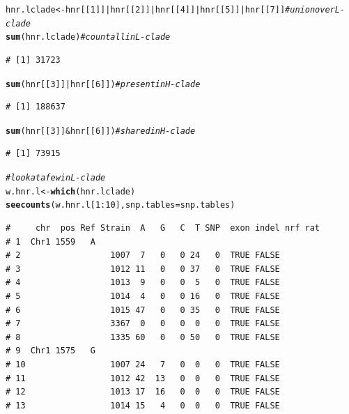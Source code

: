 \documentclass{article}\usepackage[]{graphicx}\usepackage[]{color}
\makeatletter
\newcommand{\hlnum}[1]{\textcolor[rgb]{0.686,0.059,0.569}{#1}}%
\newcommand{\hlcom}[1]{\textcolor[rgb]{0.678,0.584,0.686}{\textit{#1}}}%
\newcommand{\hlopt}[1]{\textcolor[rgb]{0,0,0}{#1}}%
\newcommand{\hlstd}[1]{\textcolor[rgb]{0.345,0.345,0.345}{#1}}%
\newcommand{\hlkwb}[1]{\textcolor[rgb]{0.69,0.353,0.396}{#1}}%
\newcommand{\hlkwc}[1]{\textcolor[rgb]{0.333,0.667,0.333}{#1}}%
\newcommand{\hlkwd}[1]{\textcolor[rgb]{0.737,0.353,0.396}{\textbf{#1}}}%
\newenvironment{kframe}{%
 \def\at@end@of@kframe{}%
 \ifinner\ifhmode%
  \def\at@end@of@kframe{\end{minipage}}%
  \begin{minipage}{\columnwidth}%
 \fi\fi%
 \def\FrameCommand##1{\hskip\@totalleftmargin \hskip-\fboxsep
 \colorbox{shadecolor}{##1}\hskip-\fboxsep
     \hskip-\linewidth \hskip-\@totalleftmargin \hskip\columnwidth}%
 \MakeFramed {\advance\hsize-\width
   \@totalleftmargin\z@ \linewidth\hsize
   \@setminipage}}%
 {\par\unskip\endMakeFramed%
 \at@end@of@kframe}
\newenvironment{knitrout}{}{} %
\makeatother
\begin{document}
\begin{knitrout}
\begin{kframe}
\begin{alltt}
\hlstd{hnr.lclade} \hlkwb{<-} \hlstd{hnr[[}\hlnum{1}\hlstd{]]} \hlopt{|} \hlstd{hnr[[}\hlnum{2}\hlstd{]]} \hlopt{|} \hlstd{hnr[[}\hlnum{4}\hlstd{]]} \hlopt{|} \hlstd{hnr[[}\hlnum{5}\hlstd{]]} \hlopt{|} \hlstd{hnr[[}\hlnum{7}\hlstd{]]}  \hlcom{# union over L-clade}
\hlkwd{sum}\hlstd{(hnr.lclade)}                                                     \hlcom{# count all in L-clade}
\end{alltt}
\begin{verbatim}
# [1] 31723
\end{verbatim}
\begin{alltt}
\hlkwd{sum}\hlstd{(hnr[[}\hlnum{3}\hlstd{]]} \hlopt{|} \hlstd{hnr[[}\hlnum{6}\hlstd{]])}                                            \hlcom{# present in H-clade}
\end{alltt}
\begin{verbatim}
# [1] 188637
\end{verbatim}
\begin{alltt}
\hlkwd{sum}\hlstd{(hnr[[}\hlnum{3}\hlstd{]]} \hlopt{&} \hlstd{hnr[[}\hlnum{6}\hlstd{]])}                                            \hlcom{# shared in H-clade}
\end{alltt}
\begin{verbatim}
# [1] 73915
\end{verbatim}
\begin{alltt}
\hlcom{# look at a few in L-clade}
\hlstd{w.hnr.l} \hlkwb{<-} \hlkwd{which}\hlstd{(hnr.lclade)}
\hlkwd{seecounts}\hlstd{(w.hnr.l[}\hlnum{1}\hlopt{:}\hlnum{10}\hlstd{],}\hlkwc{snp.tables}\hlstd{=snp.tables)}
\end{alltt}
\begin{verbatim}
#     chr  pos Ref Strain  A   G   C  T SNP  exon indel nrf rat
# 1  Chr1 1559   A                                             
# 2                  1007  7   0   0 24   0  TRUE FALSE        
# 3                  1012 11   0   0 37   0  TRUE FALSE        
# 4                  1013  9   0   0  5   0  TRUE FALSE        
# 5                  1014  4   0   0 16   0  TRUE FALSE        
# 6                  1015 47   0   0 35   0  TRUE FALSE        
# 7                  3367  0   0   0  0   0  TRUE FALSE        
# 8                  1335 60   0   0 50   0  TRUE FALSE        
# 9  Chr1 1575   G                                             
# 10                 1007 24   7   0  0   0  TRUE FALSE        
# 11                 1012 42  13   0  0   0  TRUE FALSE        
# 12                 1013 17  16   0  0   0  TRUE FALSE        
# 13                 1014 15   4   0  0   0  TRUE FALSE        

\end{verbatim}
\end{kframe}
\end{knitrout}
\end{document}
